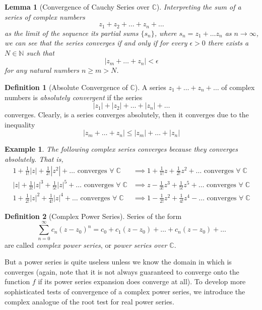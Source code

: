 \documentclass{article}
\newtheorem{lemma}[theorem]{Lemma}
\newtheorem{example}{Example}[section]
\theoremstyle{remark}
\theoremstyle{definition}
\newtheorem{definition}{Definition}[section]
\begin{document}
\begin{lemma}[Convergence of Cauchy Series over $\mathbb{C}$]
Interpreting the sum of a series of complex numbers
\[z_1 + z_2 + \ldots + z_n + \ldots\]
as the limit of the sequence its partial sums $\{s_n\}$, where $s_n = z_1 + \ldots z_n$ as $n \rightarrow \infty$, we can see that the series converges if and only if for every $\epsilon > 0$ there exists a $N \in \mathbb{N}$ such that 
\[|z_m + \ldots + z_n| < \epsilon\]
for any natural numbers $n \geq m > N$. 
\end{lemma}

\begin{definition}[Absolute Convergence of $\mathbb{C}$]
A series $z_1 + \ldots + z_n + \ldots$ of complex numbers is \textit{absolutely convergent} if the series
\[|z_1| + |z_2| + \ldots + |z_n| + \ldots\]
converges. Clearly, is a series converges absolutely, then it converges due to the inequality
\[|z_m + \ldots + z_n| \leq |z_m| + \ldots + |z_n|\]
\end{definition}

\begin{example}
The following complex series converges because they converges absolutely. That is, 
\begin{align*}
    1 + \frac{1}{1!}|z| + \frac{1}{2!}|z^2| + \ldots \text{ converges } \forall \; \mathbb{C} & \implies 1 + \frac{1}{1!}z + \frac{1}{2!}z^2 + \ldots \text{ converges } \forall \; \mathbb{C} \\
    |z| + \frac{1}{3!}|z|^3 + \frac{1}{5!}|z|^5 + \ldots \text{ converges } \forall \; \mathbb{C}  & \implies z - \frac{1}{3!} z^3 + \frac{1}{5!}z^5 + \ldots \text{ converges } \forall \; \mathbb{C} \\
    1 + \frac{1}{2!}|z|^2 + \frac{1}{4!} |z|^4 + \ldots \text{ converges }  \forall \; \mathbb{C} & \implies 1 - \frac{1}{2!}z^2 + \frac{1}{4!} z^4 - \ldots \text{ converges }  \forall \; \mathbb{C} 
\end{align*}
\end{example}

\begin{definition}[Complex Power Series]
Series of the form 
\[\sum_{n=0}^\infty c_n (z - z_0)^n = c_0 + c_1 (z - z_0) + \ldots + c_n (z - z_0) + \ldots\]
are called \textit{complex power series}, or \textit{power series over $\mathbb{C}$}. 
\end{definition}

But a power series is quite useless unless we know the domain in which is converges (again, note that it is not always guaranteed to converge onto the function $f$ if its power series expansion does converge at all). To develop more sophisticated tests of convergence of a complex power series, we introduce the complex analogue of the root test for real power series. 
\end{document}

